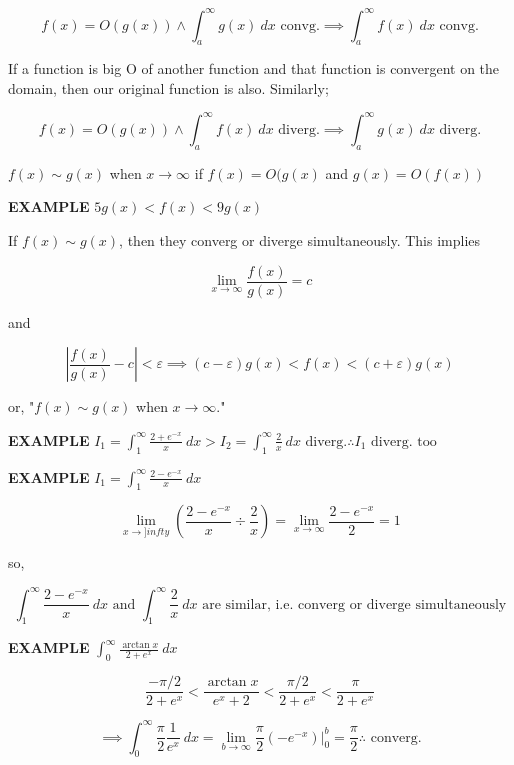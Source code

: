 \documentclass{article}
\begin{document}
\[f(x)=O(g(x))\land\int_a^\infty g(x)\ dx\mbox{ convg.}\implies\int_a^\infty f(x)\ dx\mbox{ convg.}\]

If a function is big O of another function and that function is convergent on the domain, then our original function is also. Similarly;

\[f(x)=O(g(x))\land\int_a^\infty f(x)\ dx\mbox{ diverg.}\implies\int_a^\infty g(x)\ dx\mbox{ diverg.}\]

\newpage

$f(x)\sim g(x)$ when $x\to\infty$ if $f(x)=O(g(x)$ and $g(x)=O(f(x))$

\vspace{10pt}

{\bf{}EXAMPLE} $\displaystyle5g(x)<f(x)<9g(x)$

\vspace{10pt}

If $f(x)\sim g(x)$, then they converg or diverge simultaneously. This implies

\[\lim_{x\to\infty}\frac{f(x)}{g(x)}=c\]

and

\[\left|\frac{f(x)}{g(x)}-c\right|<\varepsilon\implies(c-\varepsilon)g(x)<f(x)<(c+\varepsilon)g(x)\]

or, "$f(x)\sim g(x)$ when $x\to\infty$."

\vspace{10pt}

{\bf{}EXAMPLE} $I_1=\int_1^\infty\frac{2+e^{-x}}{x}\ dx>I_2=\int_1^\infty\frac{2}{x}\ dx\mbox{ diverg.}\therefore I_1\mbox{ diverg. too}$

\vspace{10pt}

{\bf{}EXAMPLE} $I_1=\int_1^\infty\frac{2-e^{-x}}{x}\ dx$

\[\lim_{x\to]infty}\left(\frac{2-e^{-x}}{x}\div\frac{2}{x}\right)=\lim_{x\to\infty}\frac{2-e^{-x}}{2}=1\]

so,

\[\int_1^\infty\frac{2-e^{-x}}{x}\ dx\mbox{ and }\int_1^\infty\frac{2}{x}\ dx\mbox{ are similar, i.e. converg or diverge simultaneously}\]

\vspace{10pt}

{\bf{}EXAMPLE} $\int_0^\infty\frac{\arctan x}{2+e^x}\ dx$

\[\frac{-\pi/2}{2+e^x}<\frac{\arctan x}{e^x+2}<\frac{\pi/2}{2+e^x}<\frac{\pi}{2+e^x}\]

\[\implies\int_0^\infty\frac{\pi}{2}\frac{1}{e^x}\ dx=\lim_{b\to\infty}\frac{\pi}{2}(-e^{-x})\big|_0^b=\frac{\pi}{2}\therefore\mbox{ converg.}\]
\end{document}
